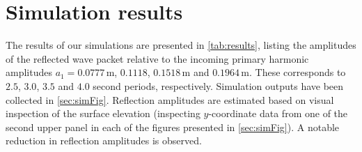 \documentclass[internal]{sintefmemo}
\renewcommand{\_}[1]{_\mr{#1}}
\begin{document}
\section{Simulation results}
\label{sec:results}
The results of our simulations are presented in \autoref{tab:results}, listing the amplitudes of the reflected wave packet relative to the incoming primary harmonic amplitudes $a_1=0.0777$\,m, $0.1118$, $0.1518$\,m and $0.1964$\,m. These corresponds to $2.5$, $3.0$, $3.5$ and $4.0$ second periods, respectively.
Simulation outputs have been collected in \autoref{sec:simFig}.
Reflection amplitudes are estimated based on visual inspection of the surface elevation (inspecting $y$-coordinate data from one of the second upper panel in each of the figures presented in \autoref{sec:simFig}).
A notable reduction in reflection amplitudes is observed.
\end{document}
